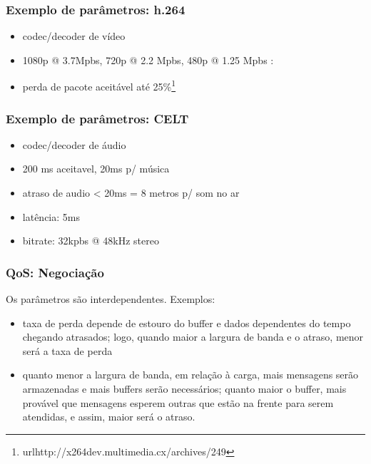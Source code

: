 \documentclass[]{beamer}
\begin{document}
\begin{frame}
  \frametitle{Exemplo de parâmetros: h.264}
 \begin{itemize}
  \item codec/decoder de vídeo
  \item 1080p @ 3.7Mpbs, 720p @ 2.2 Mpbs, 480p @ 1.25 Mpbs :  
  \item perda de pacote aceitável 
até 25\%\footnote{url{http://x264dev.multimedia.cx/archives/249}}
 \end{itemize}
\end{frame}

\begin{frame}
  \frametitle{Exemplo de parâmetros: CELT}
 \begin{itemize}
  \item codec/decoder de áudio
  \item 200 ms aceitavel, 20ms p/ música
  \item atraso de audio < 20ms = 8 metros p/ som no ar
  \item latência: 5ms
  \item bitrate: 32kpbs @ 48kHz stereo
 \end{itemize}
\end{frame}

\begin{frame}
  \frametitle{QoS: Negociação}
Os parâmetros são interdependentes. Exemplos:
\begin{itemize}
  \item taxa de perda depende de estouro do buffer e dados dependentes do tempo
chegando atrasados; logo, quando maior a largura de banda e o atraso, menor será
a taxa de perda
  \item quanto menor a largura de banda, em relação à carga, 
mais mensagens serão armazenadas e mais buffers serão necessários; quanto maior o buffer,
mais provável que mensagens esperem outras que estão na frente para serem atendidas, e
assim, maior será o atraso. 
\end{itemize}
\end{frame}
\end{document}
